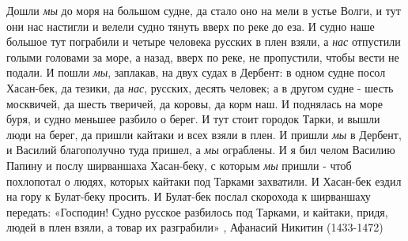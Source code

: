 Дошли \emph{мы} до моря на большом судне, да стало оно на мели в устье Волги, и тут
они нас настигли и велели судно тянуть вверх по реке до еза. И судно наше
большое тут пограбили и четыре человека русских в плен взяли, а \emph{нас} отпустили
голыми головами за море, а назад, вверх по реке, не пропустили, чтобы вести не
подали. И пошли \emph{мы}, заплакав, на двух судах в Дербент: в одном судне посол
Хасан-бек, да тезики, да \emph{нас}, русских, десять человек; а в другом судне - шесть
москвичей, да шесть тверичей, да коровы, да корм наш. И поднялась на море буря,
и судно меньшее разбило о берег. И тут стоит городок Тарки, и вышли люди на
берег, да пришли кайтаки и всех взяли в плен. И пришли \emph{мы} в Дербент, и Василий
благополучно туда пришел, а \emph{мы} ограблены. И я бил челом Василию Папину и послу
ширваншаха Хасан-беку, с которым \emph{мы} пришли - чтоб похлопотал о людях, которых
кайтаки под Тарками захватили. И Хасан-бек ездил на гору к Булат-беку просить.
И Булат-бек послал скорохода к ширваншаху передать: «Господин! Судно русское
разбилось под Тарками, и кайтаки, придя, людей в плен взяли, а товар их
разграбили»
, Афанасий Никитин (1433-1472)
